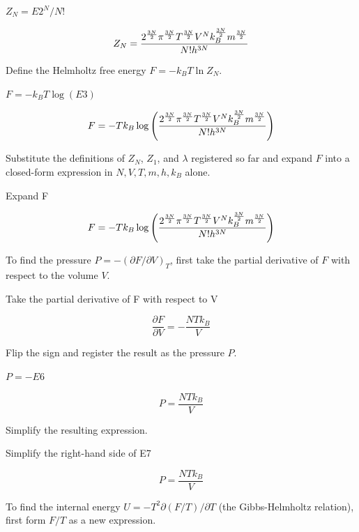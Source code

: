 \documentclass[dvipdfmx]{article}
\begin{document}
$Z_N = E2^N / N!$

\begin{equation}
  Z_N = {{2^{\frac{3 N}{2}} \pi^{\frac{3 N}{2}} T^{\frac{3 N}{2}} V^{N} k_{B}^{\frac{3 N}{2}} m^{\frac{3 N}{2}}}\over{N! h^{3 N}}}
  \label{eq:E3}
\end{equation}

Define the Helmholtz free energy $F=-k_BT\ln Z_N$.

$F = -k_B T \log(E3)$

\begin{equation}
  F = -T k_{B} \log \left({{2^{\frac{3 N}{2}} \pi^{\frac{3 N}{2}} T^{\frac{3 N}{2}} V^{N} k_{B}^{\frac{3 N}{2}} m^{\frac{3 N}{2}}}\over{N! h^{3 N}}}\right)
  \label{eq:E4}
\end{equation}

Substitute the definitions of $Z_N$, $Z_1$, and $\lambda$ registered so far and expand $F$ into a closed-form expression in $N,V,T,m,h,k_B$ alone.

Expand F

\begin{equation}
  F = -T k_{B} \log \left({{2^{\frac{3 N}{2}} \pi^{\frac{3 N}{2}} T^{\frac{3 N}{2}} V^{N} k_{B}^{\frac{3 N}{2}} m^{\frac{3 N}{2}}}\over{N! h^{3 N}}}\right)
  \label{eq:E5}
\end{equation}

To find the pressure $P=-(\partial F/\partial V)_T$, first take the partial derivative of $F$ with respect to the volume $V$.

Take the partial derivative of F with respect to V

\begin{equation}
  \frac{\partial F}{\partial V} = -\frac{N T k_{B}}{V}
  \label{eq:E6}
\end{equation}

Flip the sign and register the result as the pressure $P$.

$P = -E6$

\begin{equation}
  P = \frac{N T k_{B}}{V}
  \label{eq:E7}
\end{equation}

Simplify the resulting expression.

Simplify the right-hand side of E7

\begin{equation}
  P = \frac{N T k_{B}}{V}
  \label{eq:E8}
\end{equation}

To find the internal energy $U=-T^2\partial(F/T)/\partial T$ (the Gibbs-Helmholtz relation), first form $F/T$ as a new expression.
\end{document}
